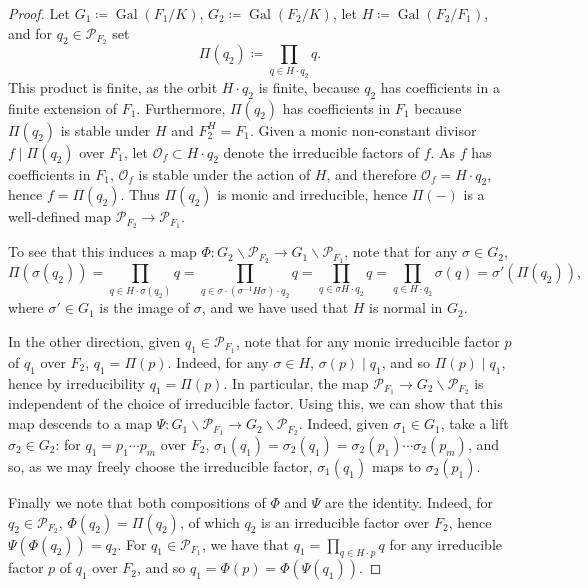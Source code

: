 \documentclass[10pt, reqno, hidelinks]{amsart}
\newcommand{\OO}{\mathcal{O}}
\DeclareMathOperator{\Gal}{Gal}
\newcommand{\sP}{{\mathcal P}}
\numberwithin{thm}{subsection}
\theoremstyle{definition}
\begin{document}
\begin{proof}
	Let $G_1 \coloneqq \Gal(F_1 / K)$, $G_2 \coloneqq \Gal(F_2 / K)$, let $H \coloneqq \Gal(F_2 / F_1)$, and for $q_2 \in \sP_{F_2}$ set
	\[
	\Pi(q_2) \coloneqq \prod_{q \in H \cdot q_2} q.
	\]
	This product is finite, as the orbit $H \cdot q_2$ is finite, because $q_2$ has coefficients in a finite extension of $F_1$. Furthermore, $\Pi(q_2)$ has coefficients in $F_1$ because $\Pi(q_2)$ is stable under $H$ and $F_2^H = F_1$. Given a monic non-constant divisor $f \mid \Pi(q_2)$ over $F_1$, let $\OO_f \subset H \cdot q_2$ denote the irreducible factors of $f$. As $f$ has coefficients in $F_1$, $\OO_f$ is stable under the action of $H$, and therefore $\OO_f = H \cdot q_2$, hence $f = \Pi(q_2)$. Thus $\Pi(q_2)$ is monic and irreducible, hence $\Pi(-)$ is a well-defined map $\sP_{F_2} \rightarrow \sP_{F_1}$.
	
	To see that this induces a map $\Phi \colon G_2 \backslash \sP_{F_2} \rightarrow G_1 \backslash \sP_{F_1}$, note that for any $\sigma \in G_2$,
	\[
	\Pi(\sigma(q_2)) = \prod_{q \in H \cdot \sigma(q_2)} q = \prod_{q \in \sigma \cdot (\sigma^{-1} H \sigma) \cdot q_2} q
	= \prod_{q \in \sigma H \cdot q_2} q = \prod_{q \in H \cdot q_2} \sigma(q) = \sigma'(\Pi(q_2)),
	\]
	where $\sigma' \in G_1$ is the image of $\sigma$, and we have used that $H$ is normal in $G_2$.

	In the other direction, given $q_1 \in \sP_{F_1}$, note that for any monic irreducible factor $p$ of $q_1$ over $F_2$, $q_1 = \Pi(p)$. Indeed, for any $\sigma \in H$, $\sigma(p) \mid q_1$, and so $\Pi(p) \mid q_1$, hence by irreducibility $q_1 = \Pi(p)$. In particular, the map $\sP_{F_1} \rightarrow G_2 \backslash \sP_{F_2}$ is independent of the choice of irreducible factor. Using this, we can show that this map descends to a map $\Psi \colon G_1 \backslash \sP_{F_1} \rightarrow G_2 \backslash \sP_{F_2}$. Indeed, given $\sigma_1 \in G_1$, take a lift $\sigma_2 \in G_2$: for $q_1 = p_1 \cdots p_m$ over $F_2$, $\sigma_1(q_1) = \sigma_2(q_1) = \sigma_2(p_1) \cdots \sigma_2(p_m)$, and so, as we may freely choose the irreducible factor, $\sigma_1(q_1)$ maps to $\sigma_2(p_1)$.

	Finally we note that both compositions of $\Phi$ and $\Psi$ are the identity. Indeed, for $q_2 \in \sP_{F_2}$, $\Phi(q_2) = \Pi(q_2)$, of which $q_2$ is an irreducible factor over $F_2$, hence $\Psi(\Phi(q_2)) = q_2$. For $q_1 \in \sP_{F_1}$, we have that $q_1 = \prod_{q \in H \cdot p} q$ for any irreducible factor $p$ of $q_1$ over $F_2$, and so $q_1 = \Phi(p) = \Phi(\Psi(q_1))$.
\end{proof}
\end{document}
